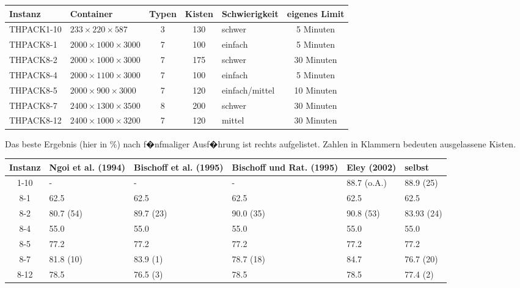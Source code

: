 \documentclass[a4paper,abstracton,12pt]{scrartcl}
\begin{document}
\begin{center}
\begin{tabular}{l|l|c|c|l|c}
Instanz \cite{packlib2} & Container & Typen & Kisten & Schwierigkeit & eigenes Limit \\ 
\hline
THPACK1-10 & $233 \times 220 \times 587$ & 3 & 130 & schwer & 5 Minuten\\
THPACK8-1 & $2000 \times 1000 \times 3000$ & 7 & 100 & einfach & 5 Minuten \\ 
THPACK8-2 & $2000 \times 1000 \times 3000$ & 7 & 175 & schwer & 30 Minuten\\ 
THPACK8-4 & $2000 \times 1100 \times 3000$ & 7 & 100 & einfach & 5 Minuten\\ 
THPACK8-5 & $2000 \times 900 \times 3000$ & 7 & 120 & einfach/mittel & 10 Minuten\\ 
THPACK8-7 & $2400 \times 1300 \times 3500$ & 8 & 200 & schwer & 30 Minuten\\ 
THPACK8-12 & $2400 \times 1000 \times 3200$ & 7 & 120 & mittel & 30 Minuten\\ 
\end{tabular}
\end{center}

Das beste Ergebnis (hier in \%) nach f�nfmaliger Ausf�hrung ist rechts aufgelistet. Zahlen in Klammern bedeuten ausgelassene Kisten.

\begin{center}
\begin{tabularx}{\textwidth}{c|X|X|X|X|l}
	Instanz & Ngoi et al. (1994) & Bischoff et al. (1995) & Bischoff und Rat. (1995) & Eley (2002) & selbst \\ 
	\hline
	1-10 & - & - & - & 88.7 (o.A.) & 88.9 (25) \\ 
	8-1 & 62.5 & 62.5 & 62.5 & 62.5 & 62.5 \\ 
	8-2 & 80.7 (54) & 89.7 (23) & 90.0 (35) & 90.8 (53) & 83.93 (24) \\ 
	8-4 & 55.0 & 55.0 & 55.0 & 55.0 & 55.0 \\ 
	8-5 & 77.2 & 77.2 & 77.2 & 77.2 & 77.2 \\ 
	8-7 & 81.8 (10) & 83.9 (1) & 78.7 (18) & 84.7 & 76.7 (20) \\ 
	8-12 & 78.5 & 76.5 (3) & 78.5 & 78.5 & 77.4 (2) \\ 
\end{tabularx}
\end{center}



\end{document}
